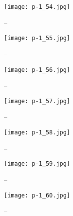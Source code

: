 \clearpage


\begin{figure}
    \begin{center}
        \texttt{[image: p-1\_54.jpg]}
        \caption{--}
    \end{center}
\end{figure}

\clearpage


\begin{figure}
    \begin{center}
        \texttt{[image: p-1\_55.jpg]}
        \caption{--}
    \end{center}
\end{figure}

\clearpage


\begin{figure}
    \begin{center}
        \texttt{[image: p-1\_56.jpg]}
        \caption{--}
    \end{center}
\end{figure}

\clearpage


\begin{figure}
    \begin{center}
        \texttt{[image: p-1\_57.jpg]}
        \caption{--}
    \end{center}
\end{figure}

\clearpage


\begin{figure}
    \begin{center}
        \texttt{[image: p-1\_58.jpg]}
        \caption{--}
    \end{center}
\end{figure}

\clearpage


\begin{figure}
    \begin{center}
        \texttt{[image: p-1\_59.jpg]}
        \caption{--}
    \end{center}
\end{figure}

\clearpage


\begin{figure}
    \begin{center}
        \texttt{[image: p-1\_60.jpg]}
        \caption{--}
    \end{center}
\end{figure}

